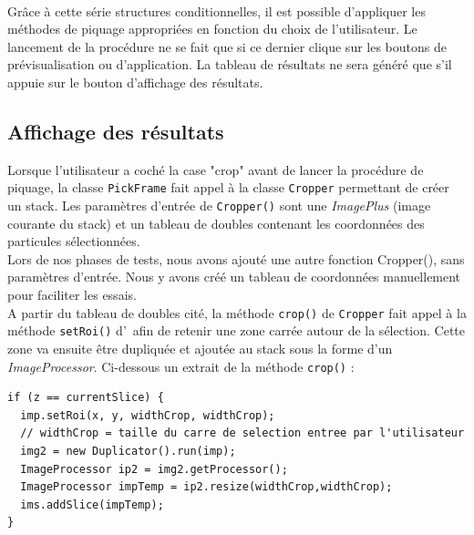 \paragraph*{}
Grâce à cette série structures conditionnelles, il est possible d'appliquer les méthodes de piquage appropriées en fonction du choix de l'utilisateur. Le lancement de la procédure ne se fait que si ce dernier clique sur les boutons de prévisualisation ou d'application. La tableau de résultats ne sera généré que s'il appuie sur le bouton d'affichage des résultats. 

\subsection{Affichage des résultats}

Lorsque l'utilisateur a coché la case "crop" avant de lancer la procédure de piquage, la classe \texttt{PickFrame} fait appel à la classe \texttt{Cropper} permettant de créer un stack. Les paramètres d'entrée de \texttt{Cropper()} sont une \emph{ImagePlus} (image courante du stack) et un tableau de doubles contenant les coordonnées des particules sélectionnées. \\
Lors de nos phases de tests, nous avons ajouté une autre fonction Cropper(), sans paramètres d'entrée. Nous y avons créé un tableau de coordonnées manuellement pour faciliter les essais. \\
A partir du tableau de doubles cité, la méthode \texttt{crop()} de \texttt{Cropper} fait appel à la méthode \texttt{setRoi()} d'\imj ~afin de retenir une zone carrée autour de la sélection. Cette zone va ensuite être dupliquée et ajoutée au stack sous la forme d'un \emph{ImageProcessor}. Ci-dessous un extrait de la méthode \texttt{crop()} : 

\begin{center}
\begin{fmpage}{16cm}
\begin{small}
\begin{lstlisting}
if (z == currentSlice) {
  imp.setRoi(x, y, widthCrop, widthCrop);  
  // widthCrop = taille du carre de selection entree par l'utilisateur
  img2 = new Duplicator().run(imp);
  ImageProcessor ip2 = img2.getProcessor();
  ImageProcessor impTemp = ip2.resize(widthCrop,widthCrop);
  ims.addSlice(impTemp);
}
\end{lstlisting}
\end{small}	
\end{fmpage}
\end{center}

